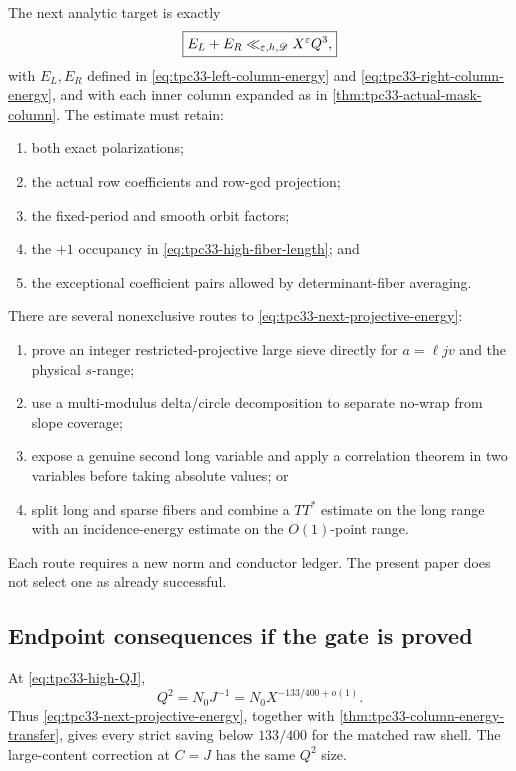 The next analytic target is exactly
\begin{equation}
 \boxed{
 E_L+E_R\ll_{\varepsilon,h,\mathscr D}X^\varepsilon Q^3,}
 \label{eq:tpc33-next-projective-energy}
\end{equation}
with \(E_L,E_R\) defined in
\eqref{eq:tpc33-left-column-energy} and
\eqref{eq:tpc33-right-column-energy}, and with each inner column expanded
as in \cref{thm:tpc33-actual-mask-column}.  The estimate must retain:
\begin{enumerate}[label=\textup{(\alph*)}]
 \item both exact polarizations;
 \item the actual row coefficients and row-gcd projection;
 \item the fixed-period and smooth orbit factors;
 \item the \(+1\) occupancy in \eqref{eq:tpc33-high-fiber-length}; and
 \item the exceptional coefficient pairs allowed by determinant-fiber
 averaging.
\end{enumerate}

There are several nonexclusive routes to
\eqref{eq:tpc33-next-projective-energy}:
\begin{enumerate}[label=\textup{(\roman*)}]
 \item prove an integer restricted-projective large sieve directly for
 \(a=\ell jv\) and the physical \(s\)-range;
 \item use a multi-modulus delta/circle decomposition to separate no-wrap
 from slope coverage;
 \item expose a genuine second long variable and apply a correlation
 theorem in two variables before taking absolute values; or
 \item split long and sparse fibers and combine a \(TT^*\) estimate on the
 long range with an incidence-energy estimate on the \(O(1)\)-point range.
\end{enumerate}
Each route requires a new norm and conductor ledger.  The present paper
does not select one as already successful.

\subsection{Endpoint consequences if the gate is proved}

At \eqref{eq:tpc33-high-QJ},
\begin{equation}
 Q^2=N_0J^{-1}
 =N_0X^{-133/400+o(1)}.
 \label{eq:tpc33-high-Q2-saving}
\end{equation}
Thus \eqref{eq:tpc33-next-projective-energy}, together with
\cref{thm:tpc33-column-energy-transfer}, gives every strict saving below
\(133/400\) for the matched raw shell.  The large-content correction at
\(C=J\) has the same \(Q^2\) size.

